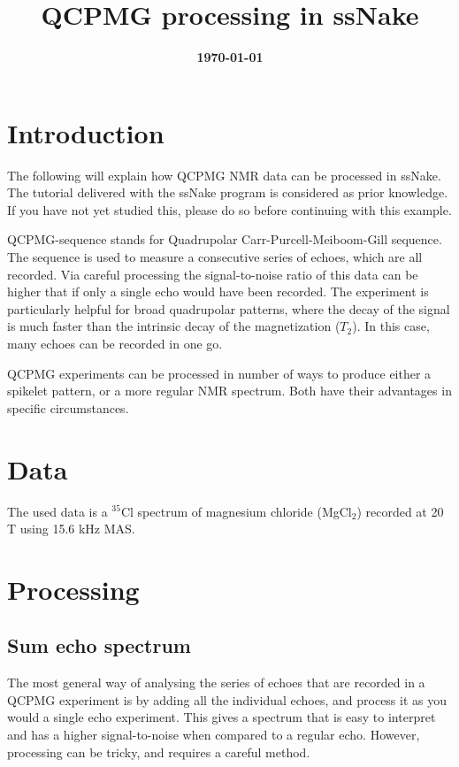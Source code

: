 \documentclass[11pt,a4paper]{article}
\title{\color{black}\fontfamily{SourceSansPro-LF}\bfseries QCPMG processing in ssNake}
\author{}
\date{\color{black}\fontfamily{SourceSansPro-LF}\bfseries \today}
\begin{document}

\maketitle

\section{Introduction}
The following will explain how QCPMG NMR data can be processed in ssNake.
 The
tutorial delivered with the ssNake program is considered as prior knowledge. If you have not yet
studied this, please do so before continuing with this example.

QCPMG-sequence stands for Quadrupolar Carr-Purcell-Meiboom-Gill sequence. The sequence is used to
measure a consecutive series of echoes, which are all recorded. Via careful processing the
signal-to-noise ratio of this data can be higher that if only a single echo would have been
recorded. The experiment is particularly helpful for broad quadrupolar patterns, where the decay of
the signal is much faster than the intrinsic decay of the magnetization ($T_2$). In this case, many
echoes can be recorded in one go.

QCPMG experiments can be processed in number of ways to produce either a spikelet pattern, or a more
regular NMR spectrum. Both have their advantages in specific circumstances.


\section{Data}
The used data is a $^{35}$Cl spectrum of magnesium chloride (MgCl$_2$) recorded at 20 T using 15.6
kHz MAS.


\section{Processing}
\subsection{Sum echo spectrum}
The most general way of analysing the series of echoes that are recorded in a QCPMG experiment is by
adding all the individual echoes, and process it as you would a single echo experiment. This
gives a spectrum that is easy to interpret and has a higher signal-to-noise when compared to a
regular echo. However, processing can be tricky, and requires a careful method.
\end{document}
